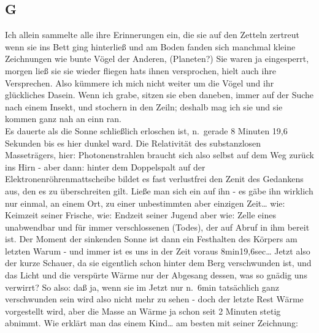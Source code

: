 \documentclass[
]{article}
\author{}
\date{\vspace{-2.5em}}
\begin{document}
\subsection{G}\label{g}

Ich allein sammelte alle ihre Erinnerungen ein, die sie auf den Zetteln
zertreut wenn sie ins Bett ging hinterließ und am Boden fanden sich
manchmal kleine Zeichnungen wie bunte Vögel der Anderen, (Planeten?) Sie
waren ja eingesperrt, morgen ließ sie sie wieder fliegen hats ihnen
versprochen, hielt auch ihre Versprechen. Also kümmere ich mich nicht
weiter um die Vögel und ihr glückliches Dasein. Wenn ich grabe, sitzen
sie eben daneben, immer auf der Suche nach einem Insekt, und stochern in
den Zeiln; deshalb mag ich sie und sie kommen ganz nah an einn ran.\\
Es dauerte als die Sonne schließlich erloschen ist, n.~gerade 8 Minuten
19,6 Sekunden bis es hier dunkel ward. Die Relativität des substanzlosen
Masseträgers, hier: Photonenstrahlen braucht sich also selbst auf dem
Weg zurück ins Hirn - aber dann: hinter dem Doppelspalt auf der
Elektronenröhrenmattscheibe bildet es fast verlustfrei den Zenit des
Gedankens aus, den es zu überschreiten gilt. Ließe man sich ein auf ihn
- es gäbe ihn wirklich nur einmal, an einem Ort, zu einer unbestimmten
aber einzigen Zeit\ldots{} wie: Keimzeit seiner Frische, wie: Endzeit
seiner Jugend aber wie: Zelle eines unabwendbar und für immer
verschlossenen (Todes), der auf Abruf in ihm bereit ist. Der Moment der
sinkenden Sonne ist dann ein Festhalten des Körpers am letzten Warum -
und immer ist es uns in der Zeit voraus 8min19,6sec\ldots{} Jetzt also
der kurze Schauer, da sie eigentlich schon hinter dem Berg verschwunden
ist, und das Licht und die verspürte Wärme nur der Abgesang dessen, was
so gnädig uns verwirrt? So also: daß ja, wenn sie im Jetzt nur n.~6min
tatsächlich ganz verschwunden sein wird also nicht mehr zu sehen - doch
der letzte Rest Wärme vorgestellt wird, aber die Masse an Wärme ja schon
seit 2 Minuten stetig abnimmt. Wie erklärt man das einem Kind\ldots{} am
besten mit seiner Zeichnung:
\end{document}
